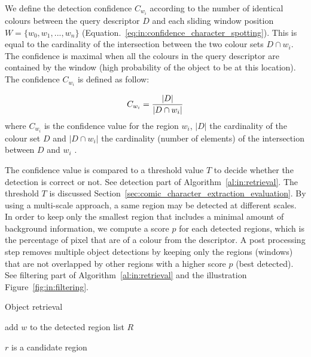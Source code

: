 We define the detection confidence $C_{w_i}$ according to the number of identical colours between the query descriptor $D$ and each sliding window position $W=\{w_0,w_1,...,w_n\}$ (Equation.~\ref{eq:in:confidence_character_spotting}).
This is equal to the cardinality of the intersection between the two colour sets $D \cap w_i$. The confidence is maximal when all the colours in the query descriptor are contained by the window (high probability of the object to be at this location).
The confidence $C_{w_i}$ is defined as follow:

\begin{equation}\label{eq:in:confidence_character_spotting}
   C_{w_i} = \frac{|D|}{|D \cap w_i|}\\
 \end{equation}
where $C_{w_i}$ is the confidence value for the region $w_i$, $|D|$ the cardinality of the colour set $D$ and $|D \cap w_i|$ the cardinality (number of elements) of the intersection between $D$ and $w_i$ .

The confidence value is compared to a threshold value $T$ to decide whether the detection is correct or not.
See detection part of Algorithm~\ref{al:in:retrieval}.
The threshold $T$ is discussed Section~\ref{sec:comic_character_extraction_evaluation}.
By using a multi-scale approach, a same region may be detected at different scales.
In order to keep only the smallest region that includes a minimal amount of background information, we compute a score $p$ for each detected regions, which is the percentage of pixel that are of a colour from the descriptor. 
A post processing step removes multiple object detections by keeping only the regions (windows) that are not overlapped by other regions with a higher score $p$ (best detected).
See filtering part of Algorithm~\ref{al:in:retrieval} and the illustration Figure~\ref{fig:in:filtering}.

\begin{algorithm}
\caption{Object retrieval}
\label{al:in:retrieval}
\begin{algorithmic}
  
    
	\STATE add $w$ to the detected region list $R$
    \ENDIF  
  \ENDFOR
\ENDFOR

\STATE{}
	     \STATE $r$ is a candidate region
    \ENDIF
\ENDFOR
\end{algorithmic}
\end{algorithm}



